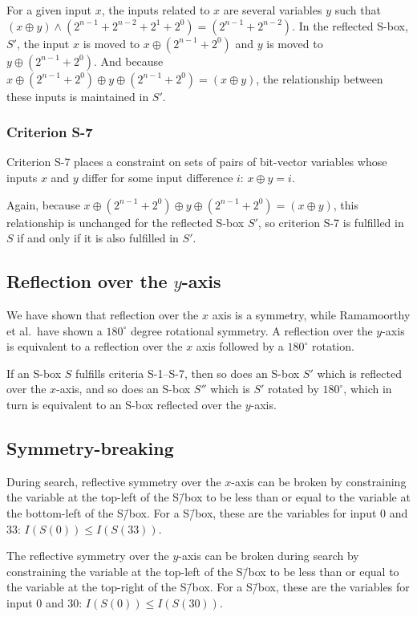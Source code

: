 For a given input $x$, the inputs related to $x$ are
several variables $y$ such that 
$(x \oplus y) \land (2^{n-1} + 2^{n-2} + 2^1 + 2^0) = (2^{n-1} + 2^{n-2})$.
In the reflected S-box, $S'$, the input $x$ is moved to 
$x \oplus (2^{n-1} + 2^0)$ 
and 
$y$ is moved to 
$y \oplus (2^{n-1} + 2^0)$.
And because 
$x \oplus (2^{n-1} + 2^0) \oplus y \oplus (2^{n-1} + 2^0) = (x \oplus y)$, 
the relationship between these inputs is maintained in $S'$.

\subsubsection{Criterion S-7}
Criterion S-7 places a constraint on sets of pairs of bit-vector variables whose inputs $x$ and $y$ 
differ for some input difference $i$: $x \oplus y = i$. 

Again, because
$x \oplus (2^{n-1} + 2^0) \oplus y \oplus (2^{n-1} + 2^0) = (x \oplus y)$,
this relationship is unchanged for the reflected S-box $S'$,
so criterion S-7 is fulfilled in $S$ if and only if it is also fulfilled in $S'$.

\subsection{Reflection over the $y$-axis}

We have shown that reflection over the $x$ axis is a symmetry, while
Ramamoorthy et al.\ have shown a $180^{\circ}$ degree rotational symmetry.
A reflection over the $y$-axis is equivalent to a reflection over the $x$ axis 
followed by a $180^{\circ}$ rotation.

If an S-box $S$ fulfills criteria S-1--S-7, 
then so does an S-box $S'$ which is reflected over the $x$-axis,
and so does an S-box $S''$ which is $S'$ rotated by $180^{\circ}$, 
which in turn is equivalent to an S-box reflected over the $y$-axis.

\subsection{Symmetry-breaking}
\label{sec:breakreflection}

During search, reflective symmetry over the $x$-axis 
can be broken by constraining the variable 
at the top-left of the S\=/box to be less than or equal to the 
variable at the bottom-left of the S\=/box.
For a \sixbyfour{} S\=/box, these are the variables for
input $0$ and $33$:
$I(S(0)) \leq I(S(33))$.

The reflective symmetry over the $y$-axis can be broken during search
by constraining the variable at the top-left of the
S\=/box to be less than or equal to
the variable at the top-right of the S\=/box.
For a \sixbyfour{} S\=/box, these are the variables for
input $0$ and $30$:
$I(S(0)) \leq I(S(30))$.
